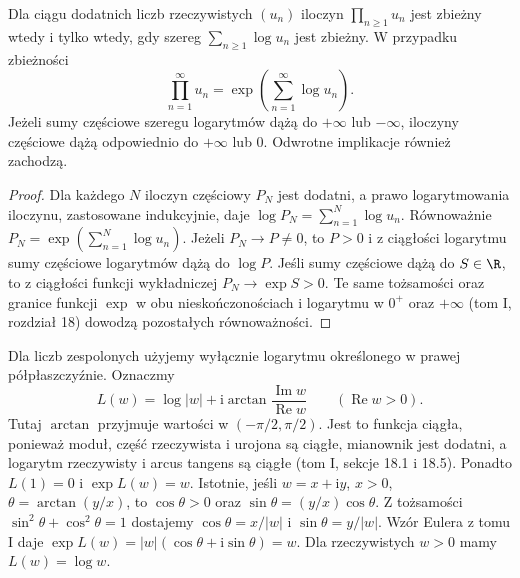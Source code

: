 \begin{twierdzenie}
\label{ma2:thm:positive-log-product}
Dla ciągu dodatnich liczb rzeczywistych $(u_n)$
iloczyn $\prod_{n\ge1}u_n$ jest zbieżny wtedy i tylko wtedy,
gdy szereg $\sum_{n\ge1}\log u_n$ jest zbieżny.
W przypadku zbieżności
\[
 \prod_{n=1}^{\infty}u_n
 =\exp\left(\sum_{n=1}^{\infty}\log u_n\right).
\]
Jeżeli sumy częściowe szeregu logarytmów dążą do $+\infty$
lub $-\infty$, iloczyny częściowe dążą odpowiednio do
$+\infty$ lub $0$. Odwrotne implikacje również zachodzą.
\end{twierdzenie}
\begin{proof}
Dla każdego $N$ iloczyn częściowy $P_N$ jest dodatni,
a prawo logarytmowania iloczynu, zastosowane indukcyjnie,
daje $\log P_N=\sum_{n=1}^N\log u_n$.
Równoważnie $P_N=\exp(\sum_{n=1}^N\log u_n)$.
Jeżeli $P_N\to P\ne0$, to $P>0$ i z ciągłości logarytmu
sumy częściowe logarytmów dążą do $\log P$.
Jeśli sumy częściowe dążą do $S\in\R$, to z ciągłości
funkcji wykładniczej $P_N\to\exp S>0$.
Te same tożsamości oraz granice funkcji $\exp$ w obu
nieskończonościach i logarytmu w $0^+$ oraz $+\infty$
(tom I, rozdział 18) dowodzą pozostałych równoważności.
\end{proof}

Dla liczb zespolonych użyjemy wyłącznie logarytmu
określonego w prawej półpłaszczyźnie. Oznaczmy
\[
 L(w)=\log |w|+\mathrm i\arctan
 \frac{\operatorname{Im}w}{\operatorname{Re}w}
 \qquad(\operatorname{Re}w>0).
\]
Tutaj $\arctan$ przyjmuje wartości w $(-\pi/2,\pi/2)$.
Jest to funkcja ciągła, ponieważ moduł, część rzeczywista
i urojona są ciągłe, mianownik jest dodatni, a logarytm
rzeczywisty i arcus tangens są ciągłe (tom I, sekcje 18.1
i 18.5). Ponadto $L(1)=0$ i $\exp L(w)=w$.
Istotnie, jeśli $w=x+\mathrm i y$, $x>0$,
$\theta=\arctan(y/x)$, to $\cos\theta>0$ oraz
$\sin\theta=(y/x)\cos\theta$. Z tożsamości
$\sin^2\theta+\cos^2\theta=1$ dostajemy
$\cos\theta=x/|w|$ i $\sin\theta=y/|w|$.
Wzór Eulera z tomu I daje
$\exp L(w)=|w|(\cos\theta+\mathrm i\sin\theta)=w$.
Dla rzeczywistych $w>0$ mamy $L(w)=\log w$.

